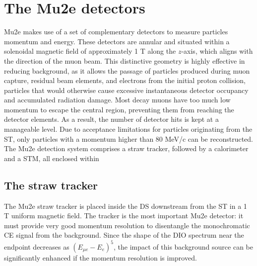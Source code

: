 \section{The Mu2e detectors}
Mu2e makes use of a set of complementary detectors to 
measure particles momentum and energy. These detectors 
are annular and situated within a solenoidal magnetic field of 
approximately 1 T along the $z$-axis, which aligns with 
the direction of the muon beam. This distinctive geometry 
is highly effective in reducing background, as it allows 
the passage of particles produced during muon capture, 
residual beam elements, and electrons from the initial proton collision, 
particles that would otherwise cause excessive instantaneous detector 
occupancy and accumulated radiation damage. Most decay muons have too much low momentum 
to escape the central region, preventing them from reaching the detector elements. 
As a result, the number of detector hits is kept at a manageable level. 
Due to acceptance limitations for particles originating from the ST, 
only particles with a momentum higher than 80 MeV/c can be reconstructed.
The Mu2e detection system comprises a straw tracker, followed by a 
calorimeter and a STM, all enclosed within 

\subsection{The straw tracker}\label{trackersec}
The Mu2e straw tracker is placed inside the DS downstream from 
the ST in a 1 T uniform magnetic field. The tracker is  the most 
important Mu2e detector: it must provide very good momentum resolution to 
disentangle the monochromatic CE signal from the background. 
Since the shape of the DIO spectrum near the endpoint decreases as 
$(E_{\mu e} -E_e)^5$, {\red the impact of this background source can be significantly enhanced if the momentum resolution is improved.}

